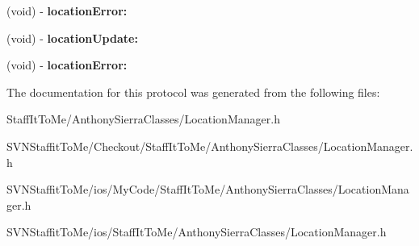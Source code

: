 \begin{DoxyCompactItemize}
\item 
\hypertarget{protocol_core_location_controller_delegate-p_a8e6db3262b0173ab7e72759afa0f167e}{
(void) -\/ {\bfseries location\-Error\-:}}
\label{protocol_core_location_controller_delegate-p_a8e6db3262b0173ab7e72759afa0f167e}

\item 
\hypertarget{protocol_core_location_controller_delegate-p_a307b2da0e181220b1ab110d9556f0d24}{
(void) -\/ {\bfseries location\-Update\-:}}
\label{protocol_core_location_controller_delegate-p_a307b2da0e181220b1ab110d9556f0d24}

\item 
\hypertarget{protocol_core_location_controller_delegate-p_a8e6db3262b0173ab7e72759afa0f167e}{
(void) -\/ {\bfseries location\-Error\-:}}
\label{protocol_core_location_controller_delegate-p_a8e6db3262b0173ab7e72759afa0f167e}

\end{DoxyCompactItemize}


\-The documentation for this protocol was generated from the following files\-:\begin{DoxyCompactItemize}
\item 
\-Staff\-It\-To\-Me/\-Anthony\-Sierra\-Classes/\-Location\-Manager.\-h\item 
\-S\-V\-N\-Staffit\-To\-Me/\-Checkout/\-Staff\-It\-To\-Me/\-Anthony\-Sierra\-Classes/\-Location\-Manager.\-h\item 
\-S\-V\-N\-Staffit\-To\-Me/ios/\-My\-Code/\-Staff\-It\-To\-Me/\-Anthony\-Sierra\-Classes/\-Location\-Manager.\-h\item 
\-S\-V\-N\-Staffit\-To\-Me/ios/\-Staff\-It\-To\-Me/\-Anthony\-Sierra\-Classes/\-Location\-Manager.\-h\end{DoxyCompactItemize}
